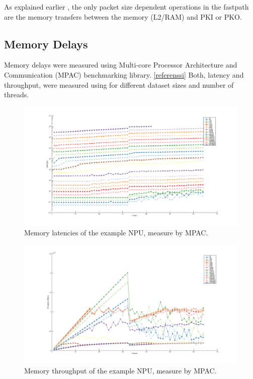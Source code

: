 As explained earlier , the only packet size dependent operations in the fastpath are the  memory transfers between the memory (L2/RAM) and PKI or PKO.

\subsection{Memory Delays}

Memory delays were measured using Multi-core Processor Architecture and Communication (MPAC) benchmarking library. \ref{referenssi} Both, latency and throughput, were measured using for different dataset sizes and number of threads.

\begin{figure}[h]
  \begin{center}
    \includegraphics[width=\textwidth]{images/mem-latency.pdf}
    \caption{Memory latencies of the example NPU, measure by MPAC. }
    \label{fig:mem-latency}
  \end{center}
\end{figure}

\begin{figure}[h]
  \begin{center}
    \includegraphics[width=\textwidth]{images/mem-throughput.pdf}
    \caption{Memory throughput of the example NPU, measure by MPAC.}
    \label{fig:mem-throughput}
  \end{center}
\end{figure}

